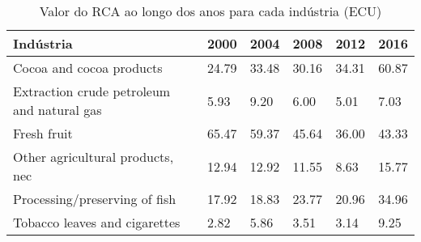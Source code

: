 \begin{table}
\centering
\caption{Valor do RCA ao longo dos anos para cada indústria (ECU)}
\begin{tabular}{p{6cm}p{1.5cm}p{1.5cm}p{1.5cm}p{1.5cm}p{1.5cm}}
\toprule
                                 Indústria &  2000 &  2004 &  2008 &  2012 &  2016 \\
\midrule
                  Cocoa and cocoa products & 24.79 & 33.48 & 30.16 & 34.31 & 60.87 \\
Extraction crude petroleum and natural gas &  5.93 &  9.20 &  6.00 &  5.01 &  7.03 \\
                               Fresh fruit & 65.47 & 59.37 & 45.64 & 36.00 & 43.33 \\
          Other agricultural products, nec & 12.94 & 12.92 & 11.55 &  8.63 & 15.77 \\
             Processing/preserving of fish & 17.92 & 18.83 & 23.77 & 20.96 & 34.96 \\
             Tobacco leaves and cigarettes &  2.82 &  5.86 &  3.51 &  3.14 &  9.25 \\
\bottomrule
\end{tabular}
\end{table}
